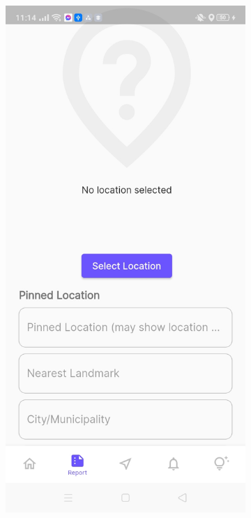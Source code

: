 \begin{figure}[!h]
\begin{subfigure}[c]{0.30\linewidth}
        \centering
        \includegraphics[scale=0.15]{figures/Chapter4/Main/p5-2.jpg}
    \end{subfigure}
    \centering
    \begin{subfigure}[c]{0.30\linewidth}

\end{subfigure}
\end{figure}
